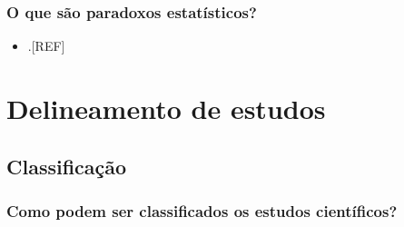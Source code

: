 \documentclass[
]{book}
\providecommand{\tightlist}{%
  \setlength{\itemsep}{0pt}\setlength{\parskip}{0pt}}
\begin{document}
\hypertarget{o-que-suxe3o-paradoxos-estatuxedsticos}{%
\subsection{O que são paradoxos estatísticos?}\label{o-que-suxe3o-paradoxos-estatuxedsticos}}

\begin{itemize}
\tightlist
\item
  .{[}REF{]}
\end{itemize}

\hypertarget{delineamento-estudos}{%
\chapter{\texorpdfstring{\textbf{Delineamento de estudos}}{Delineamento de estudos}}\label{delineamento-estudos}}

\hypertarget{classificacao}{%
\section{Classificação}\label{classificacao}}

\hypertarget{como-podem-ser-classificados-os-estudos-cientuxedficos}{%
\subsection{Como podem ser classificados os estudos científicos?}\label{como-podem-ser-classificados-os-estudos-cientuxedficos}}
\end{document}
